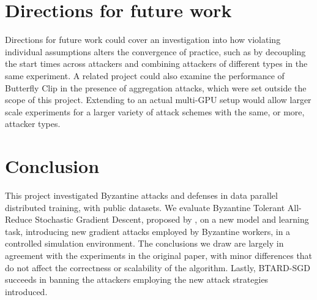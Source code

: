 \documentclass{article}
\begin{document}
\section{Directions for future work}

Directions for future work could cover an investigation into how violating individual assumptions alters the convergence of practice, such as by decoupling the start times across attackers and combining attackers of different types in the same experiment. A related project could also examine the performance of Butterfly Clip in the presence of aggregation attacks, which were set outside the scope of this project. Extending to an actual multi-GPU setup would allow larger scale experiments for a larger variety of attack schemes with the same, or more, attacker types.

\section{Conclusion}
This project investigated Byzantine attacks and defenses in data parallel distributed training, with public datasets. We evaluate Byzantine Tolerant All-Reduce Stochastic Gradient Descent, proposed by \cite{gorbunov2021secure}, on a new model and learning task, introducing new gradient attacks employed by Byzantine workers, in a controlled simulation environment. The conclusions we draw are largely in agreement with the experiments in the original paper, with minor differences that do not affect the correctness or scalability of the algorithm. Lastly, BTARD-SGD succeeds in banning the attackers employing the new attack strategies introduced.



\end{document}
